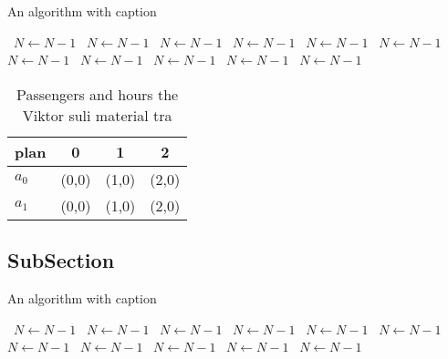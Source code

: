 \documentclass[a4paper]{article}
\begin{document}
\begin{algorithm}
\caption{An algorithm with caption}
\begin{algorithmic}
\    \State $N \gets N - 1$
\    \State $N \gets N - 1$
\    \State $N \gets N - 1$
\    \State $N \gets N - 1$
\    \State $N \gets N - 1$
\    \State $N \gets N - 1$
\    \State $N \gets N - 1$
\    \State $N \gets N - 1$
\    \State $N \gets N - 1$
\    \State $N \gets N - 1$
\    \State $N \gets N - 1$
\EndWhile
\end{algorithmic}
\end{algorithm}

\begin{table}
\begin{adjustbox}{width=0.6\columnwidth}
\begin{tabular}{|l|l|l|l|}
\hline
\textbf{plan} & \multicolumn{1}{c|}{\textbf{0}} & \multicolumn{1}{c|}{\textbf{1}} & \multicolumn{1}{c|}{\textbf{2}} \\ \hline
\textbf{$a_0$}  & (0,0) & (1,0) & (2,0) \\ \hline
\textbf{$a_1$}  & (0,0) & (1,0) & (2,0) \\ \hline
\end{tabular}
\end{adjustbox}
\caption{Passengers and hours the Viktor suli material tra
}
\end{table}

\subsection{SubSection}

\begin{algorithm}
\caption{An algorithm with caption}
\begin{algorithmic}
\    \State $N \gets N - 1$
\    \State $N \gets N - 1$
\    \State $N \gets N - 1$
\    \State $N \gets N - 1$
\    \State $N \gets N - 1$
\    \State $N \gets N - 1$
\    \State $N \gets N - 1$
\    \State $N \gets N - 1$
\    \State $N \gets N - 1$
\    \State $N \gets N - 1$
\    \State $N \gets N - 1$
\EndWhile
\end{algorithmic}
\end{algorithm}
\end{document}
